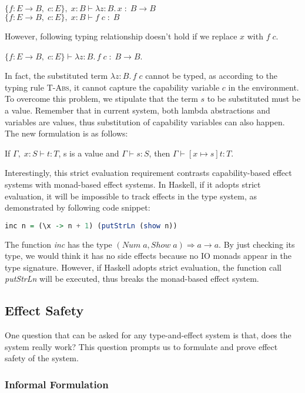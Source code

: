 $\{f: E \to B,\; c:E\},\; x:B \vdash \lambda z:B.\,x \; : \; B \to
  B$ \\
$\{f: E \to B,\; c:E\},\; x:B \vdash f \; c \; : \; B$

However, following typing relationship doesn't hold if we replace
$x$ with $f \; c$.

$\{f: E \to B,\; c:E\} \vdash \lambda z:B.\,f \; c \; : \; B \to B$.

In fact, the substituted term $\lambda z:B.\,f \; c$ cannot be typed,
as according to the typing rule \textsc{T-Abs}, it cannot capture the
capability variable $c$ in the environment. To overcome this problem,
we stipulate that the term $s$ to be substituted must be a
value. Remember that in current system, both lambda abstractions and
variables are values, thus substitution of capability variables can
also happen. The new formulation is as follows:

\begin{lemma}
  If $\Gamma,\; x:S \vdash t : T$, s is a value and
  $\Gamma \vdash s : S$, then $\Gamma \vdash [x \mapsto s]t : T$.
\end{lemma}

Interestingly, this strict evaluation requirement contrasts
capability-based effect systems with monad-based effect systems. In
Haskell, if it adopts strict evaluation, it will be impossible to
track effects in the type system, as demonstrated by following code
snippet:

\begin{lstlisting}[language=Haskell]
  inc n = (\x -> n + 1) (putStrLn (show n))
\end{lstlisting}

The function \emph{inc} has the type
$(Num\;a, Show\;a) \Rightarrow a \to a$. By just checking its type, we
would think it has no side effects because no IO monads appear in the
type signature. However, if Haskell adopts strict evaluation, the
function call \emph{putStrLn} will be executed, thus breaks the
monad-based effect system.

\subsection{Effect Safety}

One question that can be asked for any type-and-effect system is that,
does the system really work? This question prompts us to formulate and
prove effect safety of the system.

\subsubsection{Informal Formulation}

